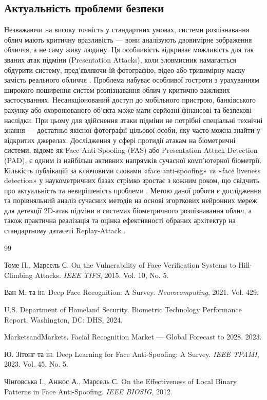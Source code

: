 \documentclass[14pt,a4paper]{extarticle}
\begin{document}
\subsection{Актуальність проблеми безпеки}
Незважаючи на високу точність у стандартних умовах, системи розпізнавання облич мають критичну вразливість — вони аналізують двовимірне зображення обличчя, а
не саму живу людину. Ця особливість відкриває можливість для так званих атак підміни (Presentation Attacks), коли зловмисник намагається обдурити систему,
пред'являючи їй фотографію, відео або тривимірну маску замість реального обличчя \cite{Yu2022Survey}.
Проблема набуває особливої гостроти з урахуванням широкого поширення систем розпізнавання облич у критично важливих застосуваннях. Несанкціонований доступ до мобільного пристрою,
банківського рахунку або охоронюваного об'єкта може мати серйозні фінансові та безпекові наслідки. При цьому для здійснення атаки підміни не потрібні спеціальні технічні знання —
достатньо якісної фотографії цільової особи, яку часто можна знайти у відкритих джерелах.
Дослідження у сфері протидії атакам на біометричні системи, відоме як Face Anti-Spoofing (FAS) або Presentation Attack Detection (PAD), є одним із найбільш активних напрямків сучасної
комп'ютерної біометрії. Кількість публікацій за ключовими словами «face anti-spoofing» та «face liveness detection» у наукометричних базах стрімко зростає з кожним роком, що свідчить про
актуальність та невирішеність проблеми \cite{Yu2022Survey}.
Метою даної роботи є дослідження та порівняльний аналіз сучасних методів на основі згорткових нейронних мереж для детекції 2D-атак підміни в системах біометричного розпізнавання облич, а
також практична реалізація та оцінка ефективності обраних архітектур на стандартному датасеті Replay-Attack \cite{Chingovska2012}.

\newpage
\begin{thebibliography}{99}

	Томе П., Марсель С. On the Vulnerability of Face Verification Systems to
	Hill-Climbing Attacks. \textit{IEEE TIFS}, 2015. Vol. 10, No. 5.

	Ван М. та ін. Deep Face Recognition: A Survey.
	\textit{Neurocomputing}, 2021. Vol. 429.

	U.S. Department of Homeland Security. Biometric Technology Performance
	Report. Washington, DC: DHS, 2024.

	MarketsandMarkets. Facial Recognition Market — Global Forecast to 2028.
	2023.

	Ю. Зітонг та ін. Deep Learning for Face Anti-Spoofing: A Survey.
	\textit{IEEE TPAMI}, 2023. Vol. 45, No. 5.

	Чінґовська І., Анжос А., Марсель С. On the Effectiveness of Local
	Binary Patterns in Face Anti-Spoofing. \textit{IEEE BIOSIG}, 2012.

\end{thebibliography}
\end{document}
